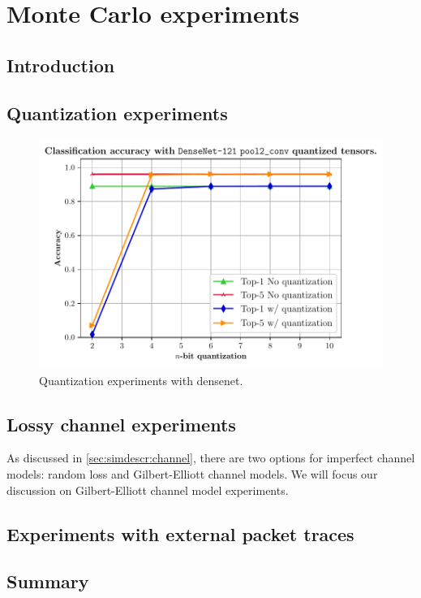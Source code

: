 \chapter{Monte Carlo experiments}\label{chapt:mc}

\section{Introduction}


\section{Quantization experiments}

\begin{figure}[H]
	\centering
	\includegraphics[scale=0.8]{Figures/quantdensenet121pool2conv.pdf}
	\caption{Quantization experiments with densenet.}
\end{figure}


\section{Lossy channel experiments}
As discussed in \ref{sec:simdescr:channel}, there are two options for imperfect channel models: random loss and Gilbert-Elliott channel models. We will focus our discussion on Gilbert-Elliott channel model experiments.



\section{Experiments with external packet traces}



\section{Summary}

